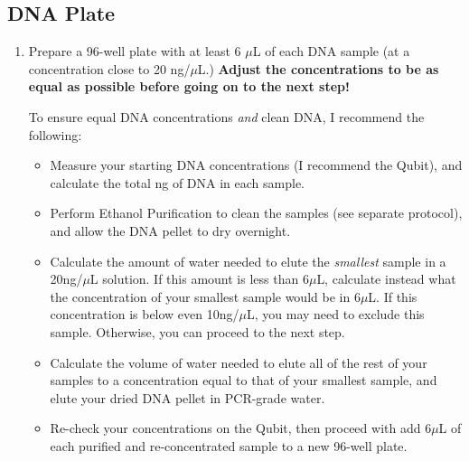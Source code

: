\documentclass{article}
\begin{document}
\subsection{DNA Plate}
\begin{enumerate}
	\item Prepare a 96-well plate with at least 6 $\mu$L of each DNA sample (at a concentration close to 20 ng/$\mu$L.)  \textbf{Adjust the concentrations to be as equal as possible before going on to the next step!}
		
		To ensure equal DNA concentrations \emph{and} clean DNA, I recommend the following:
		\begin{itemize}
			\item Measure your starting DNA concentrations (I recommend the Qubit), and calculate the total ng of DNA in each sample.
			\item Perform Ethanol Purification to clean the samples (see separate protocol), and allow the DNA pellet to dry overnight.
			\item Calculate the amount of water needed to elute the \emph{smallest} sample in a 20ng/$\mu$L solution.  If this amount is less than 6$\mu$L, calculate instead what the concentration of your smallest sample would be in 6$\mu$L.  If this concentration is below even 10ng/$\mu$L, you may need to exclude this sample.  Otherwise, you can proceed to the next step.
			\item Calculate the volume of water needed to elute all of the rest of your samples to a concentration equal to that of your smallest sample, and elute your dried DNA pellet in PCR-grade water.
			\item Re-check your concentrations on the Qubit, then proceed with add 6$\mu$L of each purified and re-concentrated sample to a new 96-well plate.
	\end{itemize}
\end{enumerate}
\end{document}
